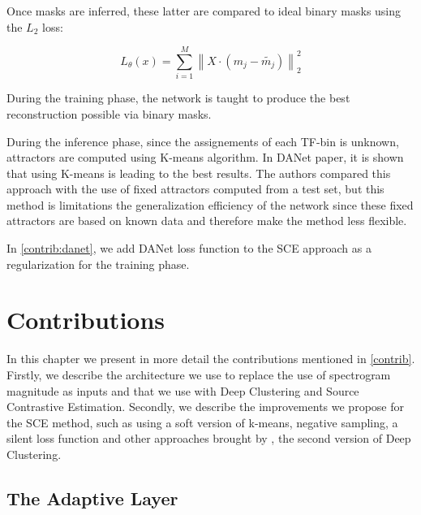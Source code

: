 \documentclass[master, tikz, final,11pt, dvipdfmx]{iscs-thesis}
\newcommand{\norm}[1]{\left\lVert#1\right\rVert}
\begin{document}
Once masks are inferred, these latter are compared to  ideal binary masks using the $L_2$ loss:

\[L_\theta(x) = \sum_{i=1}^{M} \norm{X \cdot (m_j - \tilde{m_j})}^2_2 \]

During the training phase, the network is taught to produce the best reconstruction possible via binary masks. 

During the inference phase, since the assignements of each TF-bin is unknown, attractors are computed using K-means algorithm. In DANet paper, it is shown that using K-means is leading to the best results. The authors compared this approach with the use of fixed attractors computed from a test set, but this method is limitations the generalization efficiency of the network since these fixed attractors are based on known data and therefore make the method less flexible.

In \autoref{contrib:danet}, we add DANet loss function to the SCE approach as a regularization for the training phase.

\chapter{Contributions}

In this chapter we present in more detail the contributions mentioned in \ref{contrib}. Firstly, we describe the architecture we use to replace the use of spectrogram magnitude as inputs and that we use with Deep Clustering and Source Contrastive Estimation. Secondly, we describe the improvements we propose for the SCE method, such as using a soft version of k-means, negative sampling, a silent loss function and other approaches brought by \cite{DPCLV2}, the second version of Deep Clustering.

\section{The Adaptive Layer}
\label{adapt}
\end{document}
